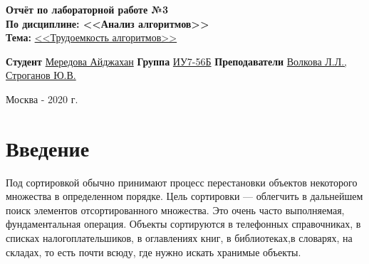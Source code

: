 \documentclass[a4paper]{article}
\begin{document}
\begin{titlepage}
		\vspace{30mm}
		\begin{center}
		\textbf{Отчёт по лабораторной работе №3}\\
		{\bf	По дисциплине: <<Анализ алгоритмов>>}\\
		{\bf Тема:} \underline {<<Трудоемкость алгоритмов>>}\\
		\end{center}
		\begin{flushleft}
			{\bf Студент}  \underline{Мередова Айджахан}\underline {\hspace{7cm}}
			\newline
			{\bf Группа} \underline{ИУ7-56Б}\underline {\hspace{10cm}}
			\newline
			{\bf Преподаватели} \underline {Волкова Л.Л., Строганов Ю.В.}
		\end{flushleft}
		\vfill
		
		\centering Москва - 2020 г.\\
	\end{titlepage}
	
	\section*{Введение}
	Под сортировкой обычно принимают процесс перестановки объектов некоторого множества в определенном порядке. Цель сортировки — облегчить в дальнейшем поиск элементов отсортированного множества. Это очень часто выполняемая, фундаментальная операция. Объекты сортируются в телефонных справочниках, в списках налогоплательшиков, в оглавлениях книг, в библиотеках,в словарях, на складах, то есть почти всюду, где нужно искать хранимые объекты. \\
	
\end{document}
